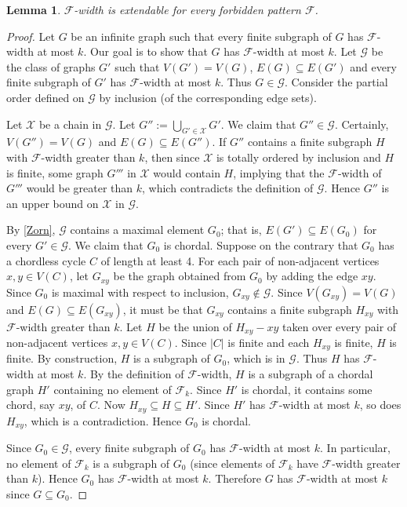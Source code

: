 \documentclass[a4paper,11pt]{article}
\theoremstyle{plain}
\newtheorem{lem}[thm]{Lemma}
\theoremstyle{definition}
\newcommand{\FF}{\mathcal{F}}
\newcommand{\XX}{\mathcal{X}}
\newcommand{\GG}{\mathcal{G}}
\begin{document}
\begin{lem}
\label{FwidthExtendable}
$\FF$-width is extendable for every forbidden pattern $\FF$.
\end{lem}

\begin{proof}
Let $G$ be an infinite graph such that every finite subgraph of $G$ has $\FF$-width at most $k$. Our goal is to show that $G$ has $\FF$-width at most $k$. Let $\GG$ be the class of graphs $G'$ such that $V(G')=V(G)$, $E(G)\subseteq E(G')$ and every finite subgraph of $G'$ has $\FF$-width at most $k$. Thus $G\in\GG$. Consider the partial order defined on $\GG$ by inclusion (of the corresponding edge sets). 

Let $\XX$ be a chain in $\GG$. Let $G'':= \bigcup_{G'\in\XX} G'$. We claim that $G''\in\GG$. Certainly, $V(G'')=V(G)$ and $E(G)\subseteq E(G'')$. If $G''$ contains a finite subgraph $H$ with $\FF$-width greater than $k$, then since $\XX$ is totally ordered by inclusion and $H$ is finite, some graph $G'''$ in $\XX$ would contain $H$, implying that the $\FF$-width of $G'''$ would be greater than $k$, which contradicts the definition of $\GG$. Hence $G''$ is an upper bound on $\XX$ in $\GG$. 

By \cref{Zorn}, $\GG$ contains a maximal element $G_0$; that is,  $E(G')\subseteq E(G_0)$ for every $G'\in \GG$. We claim that $G_0$ is chordal. Suppose on the contrary that $G_0$ has a chordless cycle $C$ of length at least 4. For each pair of non-adjacent vertices $x,y\in V(C)$, let $G_{xy}$ be the graph obtained from $G_0$ by adding the edge $xy$. Since $G_0$ is maximal with respect to inclusion, $G_{xy}\not\in\GG$. Since $V(G_{xy})=V(G)$ and $E(G)\subseteq E(G_{xy})$, it must be that $G_{xy}$ contains a finite subgraph $H_{xy}$ with $\FF$-width greater than $k$. Let $H$ be the union of $H_{xy}-xy$ taken over every pair of non-adjacent vertices $x,y\in V(C)$. Since $|C|$ is finite and each $H_{xy}$ is finite, $H$ is finite. By construction, $H$ is a subgraph of $G_0$, which is in $\GG$. Thus $H$ has $\FF$-width at most $k$. By the definition of $\FF$-width, $H$ is a subgraph of a chordal graph $H'$ containing no element of $\FF_k$. Since $H'$ is chordal, it contains some chord, say $xy$, of $C$. Now $H_{xy}\subseteq H\subseteq H'$. Since $H'$ has $\FF$-width at most $k$, so does $H_{xy}$, which is a contradiction. Hence $G_0$ is chordal. 

Since $G_0\in\GG$, every finite subgraph of $G_0$ has $\FF$-width at most $k$. In particular, no element of $\FF_k$ is a subgraph of $G_0$ (since elements of $\FF_k$ have $\FF$-width greater than $k$). Hence $G_0$ has $\FF$-width at most $k$. Therefore $G$ has $\FF$-width at most $k$ since $G\subseteq G_0$.
\end{proof}
\end{document}
